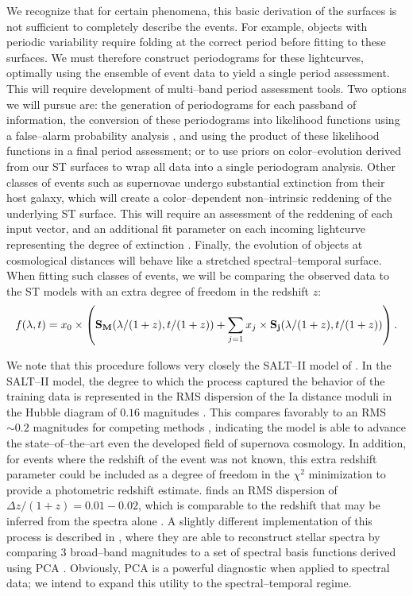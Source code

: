  We recognize that for certain
phenomena, this basic derivation of the surfaces is not sufficient to completely
describe the events. For example, objects with periodic variability require
folding at the correct period before fitting to these surfaces.  We must
therefore construct periodograms for these lightcurves, optimally using the
ensemble of event data to yield a single period assessment.  This will require
development of multi--band period assessment tools.  Two options we will pursue
are: the generation of periodograms for each passband of information, the
conversion of these periodograms into likelihood functions using a false--alarm
probability analysis \citep[e.g.][and references therein]{2009A&A...496..577Z},
and using the product of these likelihood functions in a final period
assessment; or to use priors on color--evolution derived from our ST surfaces to
wrap all data into a single periodogram analysis.  Other classes of events such
as supernovae undergo substantial extinction from their host galaxy, which will
create a color--dependent non--intrinsic reddening of the underlying ST surface.
This will require an assessment of the reddening of each input vector, and an
additional fit parameter on each incoming lightcurve representing the degree of
extinction \cite[e.g. Equation 1,][]{2007A&A...466...11G}.  Finally, the
evolution of objects at cosmological distances will behave like a stretched
spectral--temporal surface.  When fitting such classes of events, we will be
comparing the observed data to the ST models with an extra degree of freedom in
the redshift $z$: $$f(\lambda, t) = x_0 \times \left( {\bf S_M}(\lambda/(1 + z),
t/(1 + z)) + \sum_{j=1} x_j \times {\bf S_j}(\lambda/(1 + z), t/(1 + z))
\right).$$

 We note that this procedure follows very closely
the SALT--II model of \cite{2007A&A...466...11G}.  In the SALT--II model, the
degree to which the process captured the behavior of the training data is
represented in the RMS dispersion of the Ia distance moduli in the Hubble
diagram of $0.16$ magnitudes \citep{2007A&A...466...11G}.  This compares
favorably to an RMS $\sim 0.2$ magnitudes for competing methods
\citep{2009ApJS..185...32K}, indicating the model is able to advance the
state--of--the--art even the developed field of supernova cosmology. In
addition, for events where the redshift of the event was not known, this extra
redshift parameter could be included as a degree of freedom in the $\chi^2$
minimization to provide a photometric redshift estimate.
\cite{2007A&A...466...11G} finds an RMS dispersion of $\Delta z/(1 + z) =
0.01-0.02$, which is comparable to the redshift that may be inferred from the
spectra alone \citep[see also][]{2010ApJ...717...40K}.  A slightly different
implementation of this process is described in \citep{2010ApJ...719.1759A},
where they are able to reconstruct stellar spectra by comparing 3 broad--band
magnitudes to a set of spectral basis functions derived using PCA
\citep{2010AJ....139.1261M}.  Obviously, PCA is a powerful diagnostic when
applied to spectral data; we intend to expand this utility to the
spectral--temporal regime.

